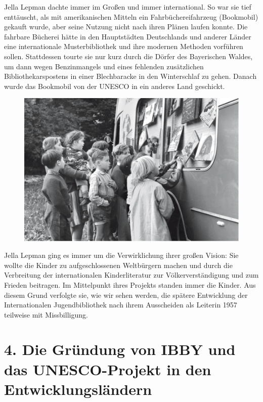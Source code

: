 \documentclass[a4paper,
fontsize=11pt,
oneside,
numbers=noperiodatend,
parskip=half-,
bibliography=totoc,
final
]{scrartcl}
\begin{document}
Jella Lepman dachte immer im Großen und immer international. So war sie
tief enttäuscht, als mit amerikanischen Mitteln ein Fahrbüchereifahrzeug
(Bookmobil) gekauft wurde, aber seine Nutzung nicht nach ihren Plänen
laufen konnte. Die fahrbare Bücherei hätte in den Hauptstädten
Deutschlands und anderer Länder eine internationale Musterbibliothek und
ihre modernen Methoden vorführen sollen. Stattdessen tourte sie nur kurz
durch die Dörfer des Bayerischen Waldes, um dann wegen Benzinmangels und
eines fehlenden zusätzlichen Bibliothekarspostens in einer Blechbaracke
in den Winterschlaf zu gehen. Danach wurde das Bookmobil von der UNESCO
in ein anderes Land geschickt.

\begin{figure}[htbp]
\centering
\includegraphics{img/bild12.jpg}
\end{figure}

Jella Lepman ging es immer um die Verwirklichung ihrer großen Vision:
Sie wollte die Kinder zu aufgeschlossenen Weltbürgern machen und durch
die Verbreitung der internationalen Kinderliteratur zur
Völkerverständigung und zum Frieden beitragen. Im Mittelpunkt ihres
Projekts standen immer die Kinder. Aus diesem Grund verfolgte sie, wie
wir sehen werden, die spätere Entwicklung der Internationalen
Jugendbibliothek nach ihrem Ausscheiden als Leiterin 1957 teilweise mit
Missbilligung.

\section*{4. Die Gründung von IBBY und das UNESCO-Projekt in den
Entwicklungsländern}\label{die-gruxfcndung-von-ibby-und-das-unesco-projekt-in-den-entwicklungsluxe4ndern}
\end{document}
